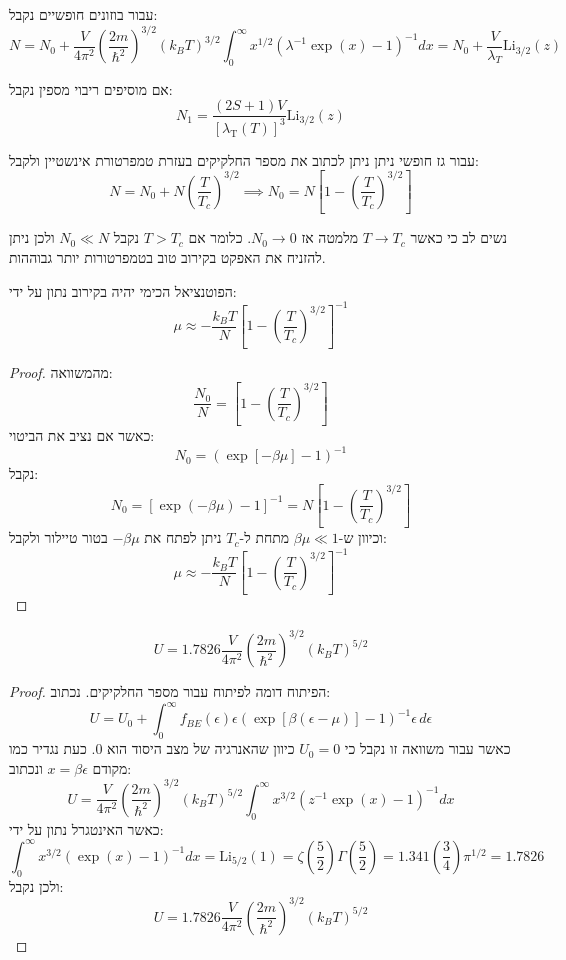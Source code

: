 \documentclass{tstextbook}
\begin{document}
\begin{corollary}
עבור בוזונים חופשיים נקבל:
$$N=N_{0}+{\frac{V}{4\pi^{2}}}\left({\frac{2m}{\hbar^{2}}}\right)^{3/2}(k_{B}T)^{3/2}\int_{0}^{\infty}x^{1/2}\left(\lambda^{-1}\exp(x)-1\right)^{-1}d x=N_{0}+\frac{V}{\lambda_{T}}\mathrm{Li}_{3 / 2}(z)$$

\end{corollary}
\begin{remark}
אם מוסיפים ריבוי מספין נקבל:
$$N_{1}=\frac{(2S+1)V}{[\lambda_{\mathrm{T}}(T)]^{3}}\mathrm{Li}_{3/2}(z)$$

\end{remark}
\begin{corollary}
עבור גז חופשי ניתן ניתן לכתוב את מספר החלקיקים בעזרת טמפרטורת אינשטיין ולקבל:
$$N=N_{0}+N\left(\frac{T}{T_c}\right)^{3/2}\implies N_{0}=N\left[1-\left(\frac{T}{T_c}\right)^{3/2}\right]$$

\end{corollary}
\begin{remark}
נשים לב כי כאשר \(T\to T_c\) מלמטה אז \(N_{0}\to 0\). כלומר אם \(T>T_c\) נקבל \(N_{0}\ll N\) ולכן ניתן להזניח את האפקט בקירוב טוב בטמפרטורות יותר גבוההות.

\end{remark}
\begin{proposition}
הפוטנציאל הכימי יהיה בקירוב נתון על ידי:
$$\mu\approx-\frac{k_{B}T}{N}\left[1-\left(\frac{T}{T_c}\right)^{3/2}\right]^{-1}$$

\end{proposition}
\begin{proof}
מהמשוואה:
$$\frac{N_{0}}{N}=\left[1-\left(\frac{T}{T_c}\right)^{3/2}\right]$$
כאשר אם נציב את הביטוי:
$$N_{0}=(\exp[-\beta\mu]-1)^{-1}$$
נקבל:
$$N_{0}=\left[\exp(-\beta\mu)-1\right]^{-1}=N\left[1-\left({\frac{T}{T_c}}\right)^{3/2}\right]$$
וכיוון ש-\(\beta \mu\ll 1\) מתחת ל-\(T_c\) ניתן לפתח את \(-\beta \mu\) בטור טיילור ולקבל:
$$\mu\approx-\frac{k_{B}T}{N}\left[1-\left(\frac{T}{T_c}\right)^{3/2}\right]^{-1}$$

\end{proof}
\begin{proposition}
$$U=1.7826\frac{V}{4\pi^{2}}\left(\frac{2m}{\hbar^{2}}\right)^{3/2}(k_{B}T)^{5/2}$$

\end{proposition}
\begin{proof}
הפיתוח דומה לפיתוח עבור מספר החלקיקים. נכתוב:
$$U=U_{0}+\int_{0}^{\infty}f_{B E}(\epsilon)\epsilon\left(\exp[\beta(\epsilon-\mu)]-1\right)^{-1}\epsilon\,d\epsilon$$
כאשר עבור משוואה זו נקבל כי \(U_{0}=0\) כיוון שהאנרגיה של מצב היסוד הוא 0. כעת נגדיר כמו מקודם \(x=\beta\epsilon\) ונכתוב:
$$U=\frac{V}{4\pi^{2}}\left(\frac{2m}{\hbar^{2}}\right)^{3/2}(k_{B}T)^{5/2}\int_{0}^{\infty}x^{3/2}\left(z^{-1}\exp(x)-1\right)^{-1}d x$$
כאשר האינטגרל נתון על ידי:
$$\int_{0}^{\infty}x^{3/2}\left(\exp(x)-1\right)^{-1}d x=\mathrm{Li}_{5 / 2}(1)=\zeta\left({\frac{5}{2}}\right)\Gamma\left({\frac{5}{2}}\right)=1.341\left({\frac{3}{4}}\right)\pi^{1/2}=1.7826$$
ולכן נקבל:
$$U=1.7826\frac{V}{4\pi^{2}}\left(\frac{2m}{\hbar^{2}}\right)^{3/2}(k_{B}T)^{5/2}$$

\end{proof}
\end{document}
